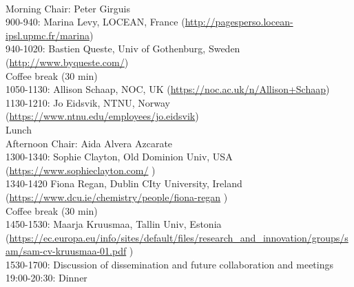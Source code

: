 \vspace{3mm}

 \\
Morning Chair: Peter Girguis \\
900-940: Marina Levy, LOCEAN, France (\url{http://pagesperso.locean-ipsl.upmc.fr/marina}) \\
940-1020: Bastien Queste, Univ of Gothenburg, Sweden (\url{http://www.byqueste.com/})\\
Coffee break (30 min) \\
1050-1130: Allison Schaap, NOC, UK (\url{https://noc.ac.uk/n/Allison+Schaap}) \\
1130-1210: Jo Eidsvik, NTNU, Norway (\url{https://www.ntnu.edu/employees/jo.eidsvik})\\
Lunch \\
Afternoon Chair: Aida Alvera Azcarate\\
1300-1340: Sophie Clayton, Old Dominion Univ, USA (\url{https://www.sophieclayton.com/} ) \\
1340-1420 Fiona Regan, Dublin CIty University, Ireland  (\url{https://www.dcu.ie/chemistry/people/fiona-regan} ) \\
Coffee break (30 min)\\
1450-1530: Maarja Kruusmaa, Tallin Univ, Estonia (\url{https://ec.europa.eu/info/sites/default/files/research_and_innovation/groups/sam/sam-cv-kruusmaa-01.pdf} ) \\
1530-1700: Discussion of dissemination and future collaboration and meetings \\
19:00-20:30: Dinner 


